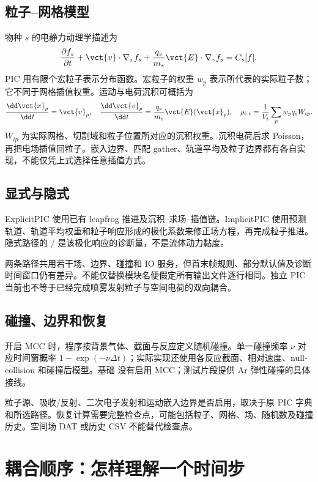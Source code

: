 \documentclass[a4paper,11pt]{article}
\begin{document}
\subsection{粒子--网格模型}
物种 $s$ 的电静力动理学描述为
\begin{equation}
\frac{\partial f_s}{\partial t}+\vct{v}\cdot\nabla_x f_s
+\frac{q_s}{m_s}\vct{E}\cdot\nabla_v f_s=C_s[f].
\end{equation}
PIC 用有限个宏粒子表示分布函数。宏粒子的权重 $w_p$ 表示所代表的实际粒子数；它不同于网格插值权重。运动与电荷沉积可概括为
\begin{equation}
\frac{\dd\vct{x}_p}{\dd t}=\vct{v}_p,\quad
\frac{\dd\vct{v}_p}{\dd t}=\frac{q_s}{m_s}\vct{E}(\vct{x}_p),\quad
\rho_{e,i}=\frac{1}{V_i}\sum_p w_pq_s W_{ip}.
\end{equation}
$W_{ip}$ 为实际网格、切割域和粒子位置所对应的沉积权重。沉积电荷后求 Poisson，再把电场插值回粒子。嵌入边界、匹配 gather、轨道平均及粒子边界都有各自实现，不能仅凭上式选择任意插值方式。

\subsection{显式与隐式}
ExplicitPIC 使用已有 leapfrog 推进及沉积--求场--插值链。ImplicitPIC 使用预测轨道、轨道平均权重和粒子响应形成的极化系数来修正场方程，再完成粒子推进。隐式路径的 / 是该极化响应的诊断量，不是流体动力黏度。

两条路径共用若干场、边界、碰撞和 IO 服务，但首末帧规则、部分默认值及诊断时间窗口仍有差异。不能仅替换模块名便假定所有输出文件逐行相同。独立 PIC 当前也不等于已经完成喷雾发射粒子与空间电荷的双向耦合。

\subsection{碰撞、边界和恢复}
开启 MCC 时，程序按背景气体、截面与反应定义随机碰撞。单一碰撞频率 $\nu$ 对应时间窗概率 $1-\exp(-\nu\Delta t)$；实际实现还使用各反应截面、相对速度、null-collision 和碰撞后模型。基础  没有启用 MCC；测试片段提供 Ar 弹性碰撞的具体接线。

粒子源、吸收/反射、二次电子发射和运动嵌入边界是否启用，取决于原 PIC 字典和所选路径。恢复计算需要完整检查点，可能包括粒子、网格、场、随机数及碰撞历史。空间场 DAT 或历史 CSV 不能替代检查点。

\section{耦合顺序：怎样理解一个时间步}
\end{document}
